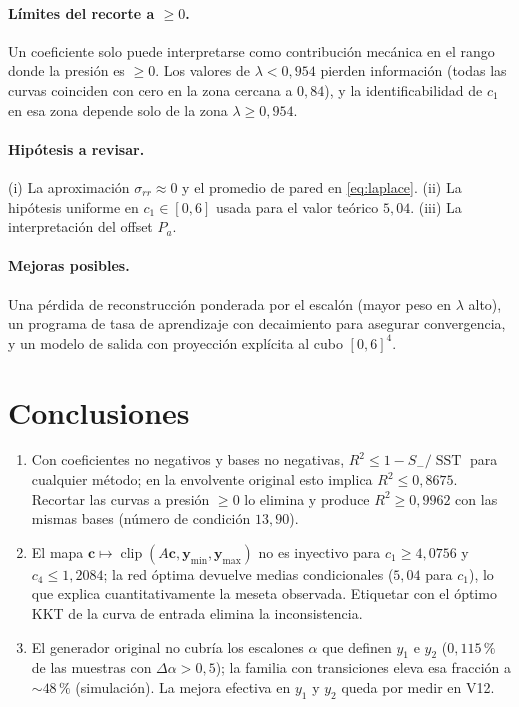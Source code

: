 \documentclass[11pt,twoside]{article}
\theoremstyle{definition}
\theoremstyle{remark}
\newcommand{\cl}{\operatorname{clip}}
\DeclareMathOperator{\SST}{SST}
\begin{document}
\paragraph{Límites del recorte a $\ge0$.} Un coeficiente solo puede interpretarse como contribución mecánica en el rango donde la presión es $\ge0$. Los valores de $\lambda<0{,}954$ pierden información (todas las curvas coinciden con cero en la zona cercana a $0{,}84$), y la identificabilidad de $c_1$ en esa zona depende solo de la zona $\lambda\ge0{,}954$.

\paragraph{Hipótesis a revisar.} (i) La aproximación $\sigma_{rr}\approx0$ y el promedio de pared en \eqref{eq:laplace}. (ii) La hipótesis uniforme en $c_1\in[0,6]$ usada para el valor teórico $5{,}04$. (iii) La interpretación del offset $P_a$.

\paragraph{Mejoras posibles.} Una pérdida de reconstrucción ponderada por el escalón (mayor peso en $\lambda$ alto), un programa de tasa de aprendizaje con decaimiento para asegurar convergencia, y un modelo de salida con proyección explícita al cubo $[0,6]^4$.

\section{Conclusiones}
\begin{enumerate}
\item Con coeficientes no negativos y bases no negativas, $R^2\le1-S_-/\SST$ para cualquier método; en la envolvente original esto implica $R^2\le0{,}8675$. Recortar las curvas a presión $\ge0$ lo elimina y produce $R^2\ge0{,}9962$ con las mismas bases (número de condición $13{,}90$).
\item El mapa $\bm c\mapsto\cl(A\bm c,\bm y_{\min},\bm y_{\max})$ no es inyectivo para $c_1\ge4{,}0756$ y $c_4\le1{,}2084$; la red óptima devuelve medias condicionales ($5{,}04$ para $c_1$), lo que explica cuantitativamente la meseta observada. Etiquetar con el óptimo KKT de la curva de entrada elimina la inconsistencia.
\item El generador original no cubría los escalones $\alpha$ que definen $y_1$ e $y_2$ ($0{,}115\,\%$ de las muestras con $\Delta\alpha>0{,}5$); la familia con transiciones eleva esa fracción a $\sim48\,\%$ (simulación). La mejora efectiva en $y_1$ y $y_2$ queda por medir en V12.
\end{enumerate}
\end{document}
